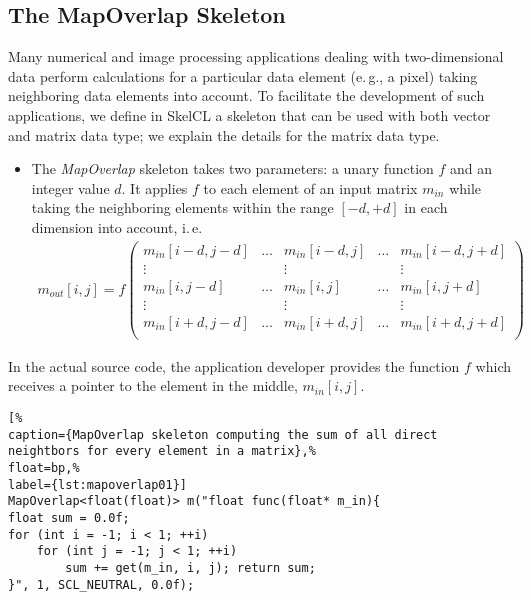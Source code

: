 \subsection{The MapOverlap Skeleton}
\label{sec:skelcl:mapoverlap}
Many numerical and image processing applications dealing with two-dimensional data perform calculations for a particular data element (e.\,g., a pixel) taking neighboring data elements into account.
To facilitate the development of such applications, we define in SkelCL a skeleton that can be used with both vector and matrix data type; we explain the details for the matrix data type.
\begin{itemize}
  \item The \emph{MapOverlap} skeleton takes two parameters: a unary function $f$ and an integer value $d$.
   It applies $f$ to each element of an input matrix $m_{in}$ while taking the neighboring elements within the range $[-d, +d]$ in each dimension into account, i.\,e.
  \begin{align*}
m_{out}[i,j]=f\left(
\begin{array}{ccccc}
m_{in}[i-d,j-d] & \hdots & m_{in}[i-d,j] & \hdots & m_{in}[i-d,j+d] \\
\vdots & ~ & \vdots & ~ & \vdots \\
m_{in}[i,j-d] & \hdots & m_{in}[i,j] & \hdots & m_{in}[i,j+d]\\
\vdots & ~ & \vdots & ~ & \vdots \\
m_{in}[i+d,j-d] & \hdots & m_{in}[i+d,j] & \hdots & m_{in}[i+d,j+d] \\
\end{array}
\right)
\end{align*}
\end{itemize}

In the actual source code, the application developer provides the function $f$ which receives a pointer to the element in the middle, $m_{in}[i,j]$.

\begin{lstlisting}[%
caption={MapOverlap skeleton computing the sum of all direct neightbors for every element in a matrix},%
float=bp,%
label={lst:mapoverlap01}]
MapOverlap<float(float)> m("float func(float* m_in){
float sum = 0.0f;
for (int i = -1; i < 1; ++i)
	for (int j = -1; j < 1; ++i)
 		sum += get(m_in, i, j); return sum;
}", 1, SCL_NEUTRAL, 0.0f);
\end{lstlisting}


